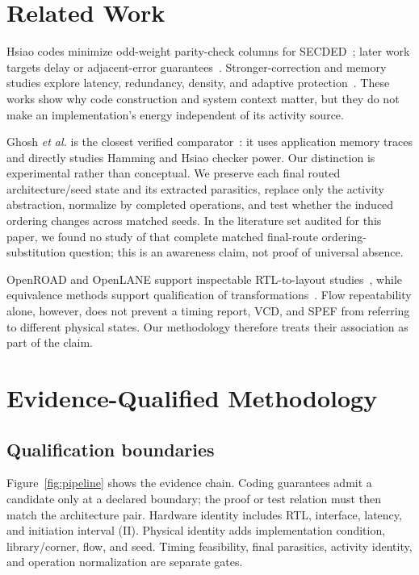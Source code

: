 \documentclass[conference,10pt]{IEEEtran}
\begin{document}
\section{Related Work}
Hsiao codes minimize odd-weight parity-check columns for SECDED~\cite{hsiao1970}; later work targets delay or adjacent-error guarantees~\cite{reviriego2013,tripathi2020}. Stronger-correction and memory studies explore latency, redundancy, density, and adaptive protection~\cite{naseer2008,delbel2014,pajouhi2015,wei2020,lee2022}. These works show why code construction and system context matter, but they do not make an implementation's energy independent of its activity source.

Ghosh \emph{et al.} is the closest verified comparator~\cite{ghosh2004}: it uses application memory traces and directly studies Hamming and Hsiao checker power. Our distinction is experimental rather than conceptual. We preserve each final routed architecture/seed state and its extracted parasitics, replace only the activity abstraction, normalize by completed operations, and test whether the induced ordering changes across matched seeds. In the literature set audited for this paper, we found no study of that complete matched final-route ordering-substitution question; this is an awareness claim, not proof of universal absence.

OpenROAD and OpenLANE support inspectable RTL-to-layout studies~\cite{ajayi2019,shalan2020}, while equivalence methods support qualification of transformations~\cite{kuehlmann1997,kuehlmann2002}. Flow repeatability alone, however, does not prevent a timing report, VCD, and SPEF from referring to different physical states. Our methodology therefore treats their association as part of the claim.

\section{Evidence-Qualified Methodology}
\subsection{Qualification boundaries}
Figure~\ref{fig:pipeline} shows the evidence chain. Coding guarantees admit a candidate only at a declared boundary; the proof or test relation must then match the architecture pair. Hardware identity includes RTL, interface, latency, and initiation interval (II). Physical identity adds implementation condition, library/corner, flow, and seed. Timing feasibility, final parasitics, activity identity, and operation normalization are separate gates.
\end{document}
